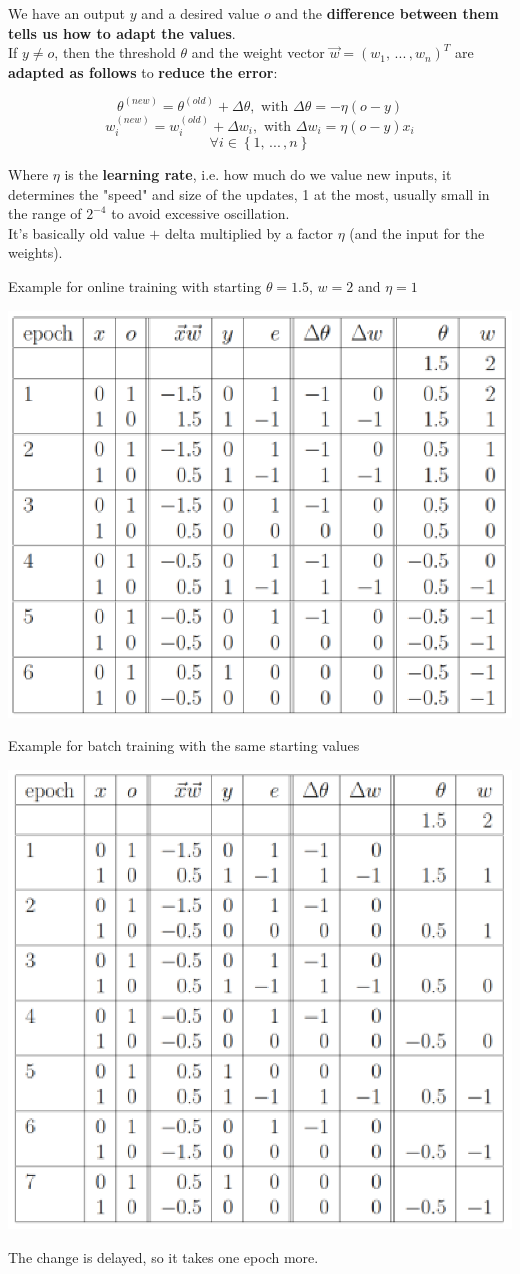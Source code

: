 \documentclass[11pt]{article}
\begin{document}
		We have an output $y$ and a desired value $o$ and the \textbf{difference between them tells us how to adapt the values}.\\
		
		If $y \neq o$, then the threshold $\theta$ and the weight vector $\vec{w} = \left(w_1, \, ... \, , w_n\right)^T$ are \textbf{adapted as follows} to \textbf{reduce the error}: 
		
		$$ \theta^{(new)} = \theta^{(old)} + \Delta \theta, \text{ with } \Delta \theta = - \eta (o - y) $$
		$$ w_i^{(new)} = w_i^{(old)} + \Delta w_i, \text{ with } \Delta w_i = \eta (o - y) x_i $$ 
		$$\forall i \in \left\{1, \, ... \, , n\right\}$$
		
		Where $\eta$ is the \textbf{learning rate}, i.e. how much do we value new inputs, it determines the "speed" and size of the updates, 1 at the most, usually small in the range of $2^{-4}$ to avoid excessive oscillation. \\
		
		It's basically old value $+$ delta multiplied by a factor $\eta$ (and the input for the weights).\\
		
		\newpage
		
		Example for online training with starting $\theta = 1.5$, $w = 2$ and $\eta = 1$
		\begin{center}
			\includegraphics[width=0.6\columnwidth]{img/NN/delta1}
		\end{center}
		
		Example for batch training with the same starting values
		\begin{center}
			\includegraphics[width=0.6\columnwidth]{img/NN/delta2}
		\end{center}
		The change is delayed, so it takes one epoch more.\\
		
\end{document}
